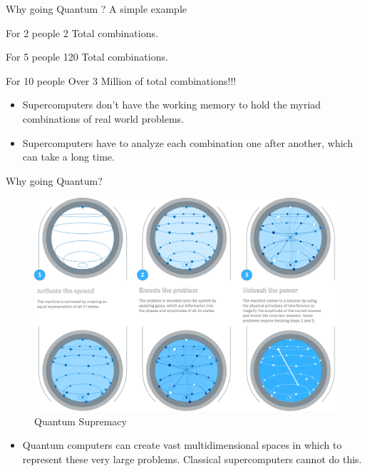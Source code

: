 \begin{frame}[<+- | only+>]{Why going Quantum ? A simple example}
	
	
	\begin{exampleblock}{For 2 people}
		2 Total combinations.
	\end{exampleblock}

	\begin{block}{For 5 people}
		120 Total combinations.
	\end{block}
	

	\begin{alertblock}{For 10 people}
		Over 3 Million of total combinations!!!
	\end{alertblock}	
	
	\begin{itemize}
		\item Supercomputers don't have the working \alert{memory} to hold the myriad combinations of real world problems.
		\item Supercomputers have to analyze each combination one after another, which can take a long \alert{time}.
	\end{itemize}
\end{frame}

\begin{frame}{Why going Quantum?}
\begin{figure}[H]
    \centering
    \includegraphics[width=.7\linewidth]{ quantumsup.png}
    \caption{Quantum Supremacy}
\end{figure}
\begin{itemize}
    \item Quantum computers can create vast multidimensional spaces in which to represent these very large problems. Classical supercomputers cannot do this.
   
\end{itemize}
  
\end{frame}

